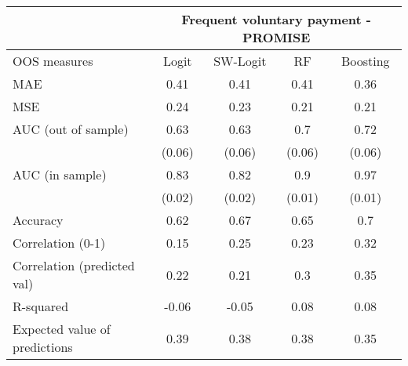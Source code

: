 \begin{tabular}{lcccc}
\toprule
      & \multicolumn{4}{c}{Frequent voluntary payment - PROMISE} \\
\midrule
\midrule
OOS measures & Logit & SW-Logit & RF    & Boosting \\
\midrule
\midrule
MAE   & 0.41  & 0.41  & 0.41  & 0.36 \\
MSE   & 0.24  & 0.23  & 0.21  & 0.21 \\
AUC (out of sample) & 0.63  & 0.63  & 0.7   & 0.72 \\
      & (0.06) & (0.06) & (0.06) & (0.06) \\
AUC (in sample) & 0.83  & 0.82  & 0.9   & 0.97 \\
      & (0.02) & (0.02) & (0.01) & (0.01) \\
Accuracy & 0.62  & 0.67  & 0.65  & 0.7 \\
Correlation (0-1) & 0.15  & 0.25  & 0.23  & 0.32 \\
Correlation (predicted val) & 0.22  & 0.21  & 0.3   & 0.35 \\
R-squared  & -0.06 & -0.05 & 0.08  & 0.08 \\
Expected value of predictions & 0.39  & 0.38  & 0.38  & 0.35 \\
\bottomrule
\bottomrule
\end{tabular}%
